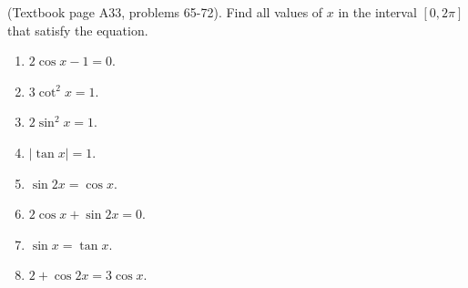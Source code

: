 \begin{problem}(Textbook page A33, problems 65-72).
Find all values of $x$ in the interval $[0,2\pi]$ that satisfy the 
equation.
\begin{multicols}{2}
\begin{enumerate}
\item $2\cos x - 1=0$. \\  
\item $3\cot^2 x= 1$. \\ 
\item $2\sin^2 x= 1$. \\ 
\item $|\tan x|=1 $. \\ 
\item $\sin 2x = \cos x $.  \\ 
\item $2\cos x +\sin 2x=0$.\\ 
\item $\sin x =\tan x$. \\ 
\item $2+\cos 2x = 3 \cos x$. \\ 
\end{enumerate}
\end{multicols}
\end{problem}
